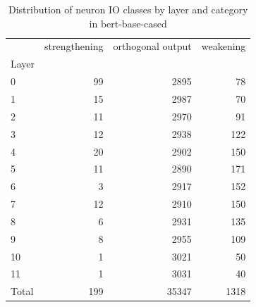 \begin{table}
\caption{Distribution of neuron IO classes by layer and category in bert-base-cased}
\label{tab:bert-base-cased}
\begin{tabular}{lrrr}
 & strengthening & orthogonal output & weakening \\
Layer &  &  &  \\
0 & 99 & 2895 & 78 \\
1 & 15 & 2987 & 70 \\
2 & 11 & 2970 & 91 \\
3 & 12 & 2938 & 122 \\
4 & 20 & 2902 & 150 \\
5 & 11 & 2890 & 171 \\
6 & 3 & 2917 & 152 \\
7 & 12 & 2910 & 150 \\
8 & 6 & 2931 & 135 \\
9 & 8 & 2955 & 109 \\
10 & 1 & 3021 & 50 \\
11 & 1 & 3031 & 40 \\
Total & 199 & 35347 & 1318 \\
\end{tabular}
\end{table}
